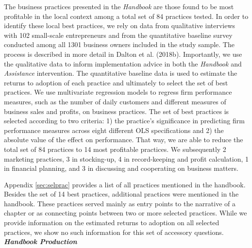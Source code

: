 \documentclass[11.5pt]{article}
\begin{document}
The business practices presented in the \emph{Handbook} are those found to be most profitable in the local context among a total set of 84 practices tested. In order to identify these local best practices, we rely on data from qualitative interviews with 102 small-scale entrepreneurs and from the quantitative baseline survey conducted among all 1301 business owners included in the study sample. The process is described in more detail in Dalton et al. (2018b). Importantly, we use the qualitative data to inform implementation advice in both the \emph{Handbook} and \emph{Assistance} intervention. The quantitative baseline data is used to estimate the returns to adoption of each practice and ultimately to select the set of best practices. We use multivariate regression models to regress firm performance measures, such as the number of daily customers and different measures of business sales and profits, on business practices. The set of best practices is selected according to two criteria: 1) the practice's significance in predicting firm performance measures across eight different OLS specifications and 2) the absolute value of the effect on performance. That way, we are able to reduce the total set of 84 practices to 14 most profitable practices. We subsequently 2 marketing practices, 3 in stocking-up, 4 in record-keeping and profit calculation, 1 in financial planning, and 3 in discussing and cooperating on business matters. 

Appendix \ref{sec:selprac} provides a list of all practices mentioned in the handbook. Besides the set of 14 best practices, additional practices were mentioned in the handbook. These practices served mainly as entry points to the narrative of a chapter or as connecting points between two or more selected practices. While we provide information on the estimated returns to adoption on all selected practices, we show no such information for this set of accessory questions. \\

\noindent \emph{\textbf{Handbook Production}}\
\end{document}
